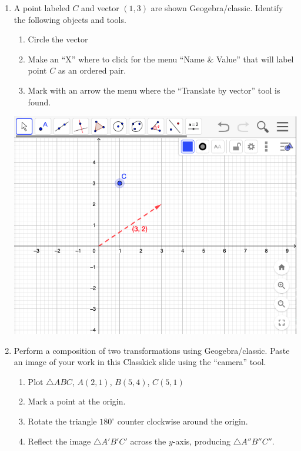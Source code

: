 \begin{enumerate}
\item A point labeled $C$ and vector $(1,3)$ are shown Geogebra/classic. Identify the following objects and tools.
  \begin{enumerate}
    \item Circle the vector
    \item Make an ``X'' where to click for the menu ``Name \& Value'' that will label point $C$ as an ordered pair.
    \item Mark with an arrow the menu where the ``Translate by vector'' tool is found.
  \end{enumerate}
  \begin{flushright}
    \includegraphics[width=6in]{../graphics/08bGeogebra_toolbar.png}
  \end{flushright}

\item Perform a composition of two transformations using Geogebra/classic. Paste an image of your work in this Classkick slide using the ``camera'' tool.
  \begin{enumerate}
    \item Plot $\triangle ABC$, $A(2,1)$, $B(5,4)$, $C(5,1)$
    \item Mark a point at the origin.
    \item Rotate the triangle $180^\circ$ counter clockwise around the origin.
    \item Reflect the image $\triangle A'B'C'$ across the $y$-axis, producing $\triangle A''B''C''$.
  \end{enumerate}


\end{enumerate}
